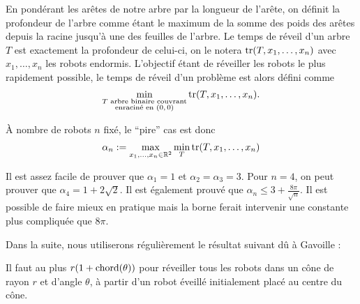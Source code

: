 En pondérant les arêtes de notre arbre par la longueur de l'arête, on définit la
profondeur de l'arbre comme étant le maximum de la somme des poids des arêtes depuis la racine jusqu'à une des feuilles de l'arbre. Le temps de réveil d'un arbre $T$ est exactement la profondeur de celui-ci, on le notera
$\operatorname{tr}(T, x_1, \dots,
  x_n)$ avec $x_1, \dots,
  x_n$ les robots endormis. L'objectif étant de réveiller les robots le plus rapidement possible,
le temps de réveil d'un problème est alors défini comme
$$\min_{\substack{T \text{ arbre binaire couvrant}\\ \text{enraciné en $(0,0)$}}} \operatorname{tr}(T, x_1, \dots,
  x_n).$$

À nombre de robots $n$ fixé, le ``pire'' cas est donc
  $$\alpha_n := \max_{x_1, \dots, x_n \in \mathbb{R}^2} \min_T \operatorname{tr}(T, x_1, \dots,
x_n)$$

Il est assez facile de prouver que  $\alpha_1 = 1$ et $\alpha_2 = \alpha_3 = 3$.
Pour $n=4$, on peut prouver que $\alpha_4 = 1 + 2\sqrt{2}$. Il est également prouvé que $\alpha_n \leq 3 +
\frac{8\pi}{\sqrt{n}}$. Il est possible de faire mieux en pratique mais la borne
ferait intervenir une constante plus compliquée que $8\pi$.

Dans la suite, nous utiliserons régulièrement le résultat suivant dû à Gavoille :
\begin{theorem}\label{coneworst}
  Il faut au plus $r(1 + \operatorname{chord}(\theta))$ pour réveiller tous les robots dans un
  cône de rayon $r$ et d'angle $\theta$, à partir d'un robot éveillé
  initialement placé au centre du cône.
\end{theorem}
